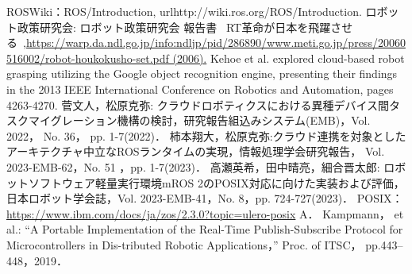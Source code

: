 \documentclass[11pt]{ujarticle}
\begin{document}
\begin{thebibliography}{99}
	ROSWiki：ROS/Introduction, url{http://wiki.ros.org/ROS/Introduction.}
	ロボット政策研究会: ロボット政策研究会 報告書 ~RT革命が日本を飛躍させる~,\url{https://warp.da.ndl.go.jp/info:ndljp/pid/286890/www.meti.go.jp/press/20060516002/robot-houkokusho-set.pdf (2006).}
	Kehoe et al. explored cloud-based robot grasping utilizing the Google object recognition engine, presenting their findings in the 2013 IEEE International Conference on Robotics and Automation, pages 4263-4270.
	菅文人，松原克弥: クラウドロボティクスにおける異種デバイス間タスクマイグレーション機構の検討，研究報告組込みシステム(EMB)，Vol. 2022， No. 36， pp. 1-7(2022)．
	柿本翔大，松原克弥:クラウド連携を対象としたアーキテクチャ中立なROSランタイムの実現，情報処理学会研究報告， Vol. 2023-EMB-62，No. 51 ，pp. 1-7(2023)．
	高瀬英希，田中晴亮，細合晋太郎: ロボットソフトウェア軽量実行環境mROS 2のPOSIX対応に向けた実装および評価，日本ロボット学会誌，Vol. 2023-EMB-41，No. 8，pp. 724-727(2023)．
	 POSIX：\url{https://www.ibm.com/docs/ja/zos/2.3.0?topic=ulero-posix}
	A． Kampmann， et al.: “A Portable Implementation of the Real-Time Publish-Subscribe Protocol for Microcontrollers in Dis-tributed Robotic Applications，” Proc. of ITSC， pp.443–448，2019．
\end{thebibliography}
\end{document}
